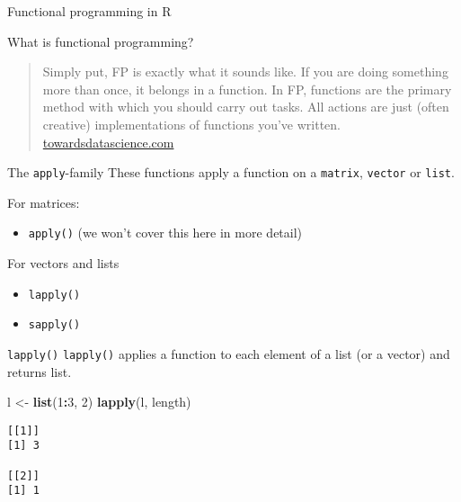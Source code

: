 \documentclass[ignorenonframetext,,t]{beamer}
\let\oldtextbf\textbf
\renewcommand{\textbf}[1]{\textcolor{spamwell}{\oldtextbf{#1}}}
\providecommand{\tightlist}{%
\setlength{\itemsep}{0pt}\setlength{\parskip}{0pt}}
\newenvironment{Shaded}{\begin{snugshade}}{\end{snugshade}}
\newcommand{\DecValTok}[1]{\textcolor[rgb]{0.00,0.00,0.81}{#1}}
\newcommand{\FunctionTok}[1]{\textcolor[rgb]{0.13,0.29,0.53}{\textbf{#1}}}
\newcommand{\NormalTok}[1]{#1}
\newcommand{\OtherTok}[1]{\textcolor[rgb]{0.56,0.35,0.01}{#1}}
\newcommand{\SpecialCharTok}[1]{\textcolor[rgb]{0.81,0.36,0.00}{\textbf{#1}}}
\providecommand{\tightlist}{%
\setlength{\itemsep}{0pt}\setlength{\parskip}{0pt}}
\renewcommand{\tightlist}{\setlength{\itemsep}{1.4ex}\setlength{\parskip}{0pt}}
\begin{document}
\begin{frame}{Functional programming in R}
\label{functional-programming-in-r}
\begin{block}{What is functional programming?}
\label{what-is-functional-programming}
\begin{quote}
Simply put, FP is exactly what it sounds like. If you are doing
something more than once, it belongs in a function. In FP, functions are
the primary method with which you should carry out tasks. All actions
are just (often creative) implementations of functions you've written.
\href{https://towardsdatascience.com/cleaner-r-code-with-functional-programming-adc37931ef7a}{towardsdatascience.com}
\end{quote}
\end{block}
\end{frame}

\begin{frame}[fragile]
\begin{block}{The \texttt{apply}-family}
\label{the-apply-family}
These functions apply a function on a \texttt{matrix}, \texttt{vector}
or \texttt{list}.

For matrices:

\begin{itemize}
\tightlist
\item
  \texttt{apply()} (we won't cover this here in more detail)
\end{itemize}

For vectors and lists

\begin{itemize}
\tightlist
\item
  \texttt{lapply()}
\item
  \texttt{sapply()}
\end{itemize}
\end{block}
\end{frame}

\begin{frame}[fragile]
\begin{block}{\texttt{lapply()}}
\label{lapply}
\texttt{lapply()} applies a function to each element of a list (or a
vector) and returns list.

\begin{Shaded}
\begin{Highlighting}[]
\NormalTok{l }\OtherTok{\textless{}{-}} \FunctionTok{list}\NormalTok{(}\DecValTok{1}\SpecialCharTok{:}\DecValTok{3}\NormalTok{, }\DecValTok{2}\NormalTok{)}
\FunctionTok{lapply}\NormalTok{(l, length)}
\end{Highlighting}
\end{Shaded}

\begin{verbatim}
[[1]]
[1] 3

[[2]]
[1] 1
\end{verbatim}
\end{block}
\end{frame}
\end{document}
